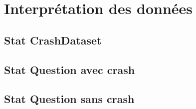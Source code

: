 \section{Interprétation des données}
\subsection{Stat CrashDataset}
\subsection{Stat Question avec crash}
\subsection{Stat Question sans crash}